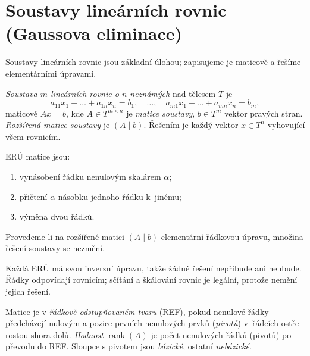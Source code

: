 \documentclass[11pt,a4paper]{article}
\newcommand{\rank}{\operatorname{rank}}
\begin{document}
\section{Soustavy lineárních rovnic (Gaussova eliminace)}

Soustavy lineárních rovnic jsou základní úlohou; zapisujeme je maticově a řešíme elementárními úpravami.

\begin{definice}
\emph{Soustava $m$ lineárních rovnic o $n$ neznámých} nad tělesem $T$ je
\[
  a_{11}x_1+\dots+a_{1n}x_n=b_1,\quad\dots,\quad a_{m1}x_1+\dots+a_{mn}x_n=b_m,
\]
maticově $Ax=b$, kde $A\in T^{m\times n}$ je \emph{matice soustavy}, $b\in T^m$ vektor pravých stran. \emph{Rozšířená matice soustavy} je $(A\mid b)$. Řešením je každý vektor $x\in T^n$ vyhovující všem rovnicím.
\end{definice}

\begin{definice}
ERÚ matice jsou:
\begin{enumerate}[label=(\arabic*)]
  \item vynásobení řádku nenulovým skalárem $\alpha$;
  \item přičtení $\alpha$-násobku jednoho řádku k~jinému;
  \item výměna dvou řádků.
\end{enumerate}
\end{definice}

\begin{veta}
Provedeme-li na rozšířené matici $(A\mid b)$ elementární řádkovou úpravu, množina řešení soustavy se nezmění.
\end{veta}

\begin{intuice}
Každá ERÚ má svou inverzní úpravu, takže žádné řešení nepřibude ani neubude. Řádky odpovídají rovnicím; sčítání a škálování rovnic je legální, protože nemění jejich řešení.
\end{intuice}

\begin{definice}
Matice je v \emph{řádkově odstupňovaném tvaru} (REF), pokud nenulové řádky předcházejí nulovým a pozice prvních nenulových prvků (\emph{pivotů}) v~řádcích ostře rostou shora dolů. \emph{Hodnost} $\rank(A)$ je počet nenulových řádků (pivotů) po převodu do REF. Sloupce s pivotem jsou \emph{bázické}, ostatní \emph{nebázické}.
\end{definice}
\end{document}
